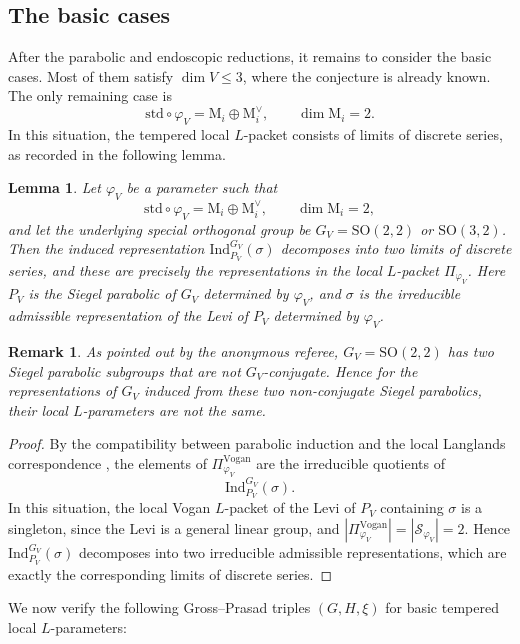 \documentclass[12pt]{amsart}
\numberwithin{equation}{subsection}
\newcommand{\CS}{{\mathcal {S}}}
\newcommand{\RM}{{\mathrm {M}}}
\newcommand{\Ind}{{\mathrm{Ind}}}
\newcommand{\SO}{{\mathrm{SO}}}
\def\sig{{\sigma}}
\def\std{\mathrm{std}}
\def\vphi{\varphi}
\def\SO{\mathrm{SO}}
\newtheorem{rmk}[thm]{Remark}
\newtheorem{lem}[thm]{Lemma}
\begin{document}
\subsection{The basic cases}\label{subsec:theproof}

After the parabolic and endoscopic reductions, it remains to consider the basic cases. Most of them satisfy $\dim V\leq 3$, where the conjecture is already known. The only remaining case is
\[
\std \circ \vphi_V = \RM_i\oplus \RM_i^\vee,\qquad \dim \RM_i = 2.
\]
In this situation, the tempered local $L$-packet consists of limits of discrete series, as recorded in the following lemma.

\begin{lem}
Let $\vphi_V$ be a parameter such that
\[
\std \circ \vphi_V = \RM_i\oplus \RM^\vee_i,\qquad \dim \RM_i = 2,
\]
and let the underlying special orthogonal group be $G_V=\SO(2,2)$ or $\SO(3,2)$. Then the induced representation $\Ind^{G_V}_{P_V}(\sig)$ decomposes into two limits of discrete series, and these are precisely the representations in the local $L$-packet $\Pi_{\vphi_V}$. Here $P_V$ is the Siegel parabolic of $G_V$ determined by $\vphi_V$, and $\sig$ is the irreducible admissible representation of the Levi of $P_V$ determined by $\vphi_V$.
\end{lem}

\begin{rmk}
As pointed out by the anonymous referee, $G_V=\SO(2,2)$ has two Siegel parabolic subgroups that are not $G_V$-conjugate. Hence for the representations of $G_V$ induced from these two non-conjugate Siegel parabolics, their local $L$-parameters are not the same.
\end{rmk}

\begin{proof}
By the compatibility between parabolic induction and the local Langlands correspondence \cite[Defin.~4.10]{adams2016contragredient}, the elements of $\Pi^{\mathrm{Vogan}}_{\vphi_V}$ are the irreducible quotients of
\[
\Ind^{G_V}_{P_V}(\sig).
\]
In this situation, the local Vogan $L$-packet of the Levi of $P_V$ containing $\sig$ is a singleton, since the Levi is a general linear group, and
$|\Pi^{\mathrm{Vogan}}_{\vphi_V}| = |\CS_{\vphi_V}| = 2$. Hence $\Ind^{G_V}_{P_V}(\sig)$ decomposes into two irreducible admissible representations, which are exactly the corresponding limits of discrete series.
\end{proof}


We now verify the following Gross--Prasad triples $(G,H,\xi)$ for basic tempered local $L$-parameters:
\end{document}
